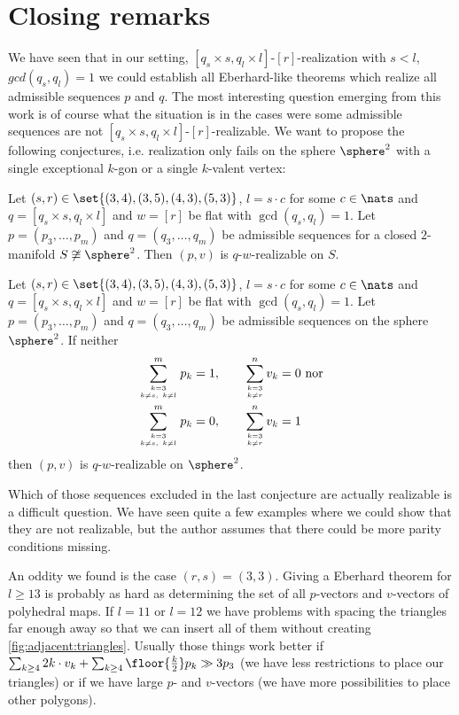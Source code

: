 \section{Closing remarks}\label{sec:closing:remarks}

We have seen that in our setting, $[q_s \times s, q_l \times l]$-$[r]$-realization with $s < l$, $gcd(q_s, q_l) = 1$ we could establish all {\sc Eberhard}-like theorems which realize all admissible sequences $p$ and $q$. The most interesting question emerging from this work is of course what the situation is in the cases were some admissible sequences are not $[q_s \times s, q_l \times l]$-$[r]$-realizable. We want to propose the following conjectures, i.e. realization only fails on the sphere $\sphere^2$ with a single exceptional $k$-gon or a single $k$-valent vertex:

\begin{conjecture}
  Let $(s, r) \in \set{(3, 4), (3, 5), (4, 3), (5, 3)}$, $l = s \cdot c$ for some $c \in \nats$ and $q = [q_s \times s, q_l \times l]$ and $w = [r]$ be flat with $\gcd(q_s, q_l) = 1$. Let $p = (p_3, \dots, p_m)$ and $q = (q_3, \dots, q_m)$ be admissible sequences for a closed $2$-manifold $S \not\cong \sphere^2$. Then $(p, v)$ is $q$-$w$-realizable on $S$.
\end{conjecture}

\begin{conjecture}
  Let $(s, r) \in \set{(3, 4), (3, 5), (4, 3), (5, 3)}$, $l = s \cdot c$ for some $c \in \nats$ and $q = [q_s \times s, q_l \times l]$ and $w = [r]$ be flat with $\gcd(q_s, q_l) = 1$. Let $p = (p_3, \dots, p_m)$ and $q = (q_3, \dots, q_m)$ be admissible sequences on the sphere $\sphere^2$. If neither
  \begin{align*}
    \sum_{k = 3 \atop k \neq s, ~k \neq l}^m p_k = 1, \qquad&\sum_{k = 3 \atop k \neq r}^n v_k = 0 \text{~nor} \\
    \sum_{k = 3 \atop k \neq s, ~k \neq l}^m p_k = 0, \qquad&\sum_{k = 3 \atop k \neq r}^n v_k = 1
  \end{align*}
then $(p, v)$ is $q$-$w$-realizable on $\sphere^2$.
\end{conjecture}

Which of those sequences excluded in the last conjecture are actually realizable is a difficult question. We have seen quite a few examples where we could show that they are not realizable, but the author assumes that there could be more parity conditions missing.

An oddity we found is the case $(r, s) = (3, 3)$. Giving a {\sc Eberhard} theorem for $l \geq 13$ is probably as hard as determining the set of all $p$-vectors and $v$-vectors of polyhedral maps. If $l = 11$ or $l = 12$ we have problems with spacing the triangles far enough away so that we can insert all of them without creating \autoref{fig:adjacent:triangles}. Usually those things work better if $\sum_{k \geq 4} 2k \cdot v_k + \sum_{k \geq 4} \floor{\tfrac{k}{2}} p_k \gg 3p_3$ (we have less restrictions to place our triangles) or if we have large $p$- and $v$-vectors (we have more possibilities to place other polygons).


